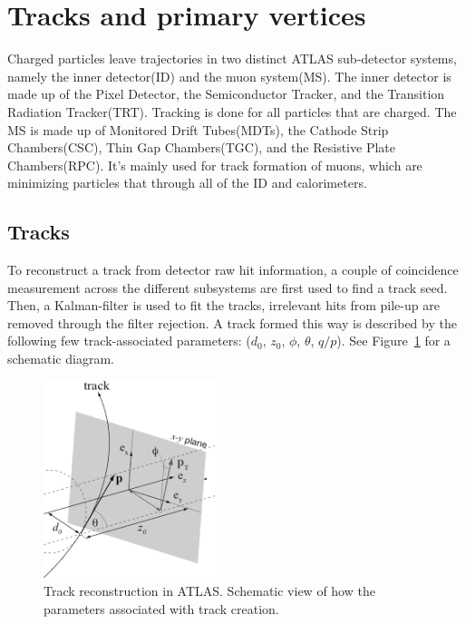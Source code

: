 \section{Tracks and primary vertices}
\label{sec:Tracks}
Charged particles leave trajectories in two distinct ATLAS sub-detector systems, namely the inner detector(ID) and the muon system(MS). The inner detector is made up of the Pixel Detector, the Semiconductor Tracker, and the Transition Radiation Tracker(TRT). Tracking is done for all particles that are charged. The MS is made up of Monitored Drift Tubes(MDTs), the Cathode Strip Chambers(CSC), Thin Gap Chambers(TGC), and the Resistive Plate Chambers(RPC). It's mainly used for track formation of muons, which are minimizing particles that through all of the ID and calorimeters.

\subsection*{Tracks}
To reconstruct a track from detector raw hit information, a couple of coincidence measurement across the different subsystems are first used to find a track seed. Then, a Kalman-filter is used to fit the tracks, irrelevant hits from pile-up are removed through the filter rejection.  
A track formed this way is described by the following few track-associated parameters: ($d_{0}$, $z_{0}$, $\phi$, $\theta$, $q/p$). See Figure~\ref{fig:track} for a schematic diagram.

\begin{figure}[!htb]
    \begin{center}
        \includegraphics[width=0.45\textwidth]{figures/common_ana/Track}
        \caption{ 
            Track reconstruction in ATLAS. Schematic view of how the parameters associated with track creation.
        }
        \label{fig:track}
    \end{center}
\end{figure}

